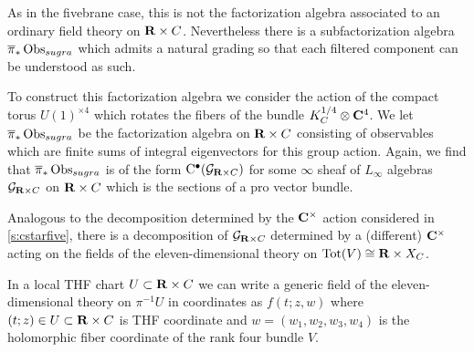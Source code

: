 \documentclass[11pt]{amsart}
\begin{document}
As in the fivebrane case, this is not the factorization algebra associated to an ordinary field theory on $\mathbf{R} \times C$.
Nevertheless there is a subfactorization algebra $\overline{\pi}_* \operatorname{Obs}_{sugra}$ which admits a natural grading so that each filtered component can be understood as such.

To construct this factorization algebra we consider the action of the compact torus $U(1)^{\times 4}$ which rotates the fibers of the bundle $K_C^{1/4} \otimes \mathbf{C}^4$.
We let $\overline{\pi}_* \operatorname{Obs}_{sugra}$ be the factorization algebra on $\mathbf{R} \times C$ consisting of observables which are finite sums of integral eigenvectors for this group action.
Again, we find that $\overline{\pi}_* \operatorname{Obs}_{sugra}$ is of the form ${\rm C}^\bullet(\mathcal G_{\mathbf{R} \times C})$ for some $\infty$ sheaf of $L_\infty$ algebras $\mathcal G_{\mathbf{R} \times C}$ on $\mathbf{R} \times C$ which is the sections of a pro vector bundle. 

Analogous to the decomposition determined by the $\mathbf{C}^\times$ action considered in \ref{s:cstarfive}, there is a decomposition of $\mathcal G_{\mathbf{R} \times C}$ determined by a (different) $\mathbf{C}^\times$ acting on the fields of the eleven-dimensional theory on ${\rm Tot}(V) \cong \mathbf{R} \times X_C$.

In a local THF chart $U \subset \mathbf{R} \times C$ we can write a generic field of the eleven-dimensional theory on $\pi^{-1} U$ in coordinates as $f(t;z,w)$ where $(t;z) \in U \subset\mathbf{R} \times C$ is THF coordinate and $w=(w_1,w_2,w_3,w_4)$ is the holomorphic fiber coordinate of the rank four bundle $V$.

%
%
%
%
\end{document}
